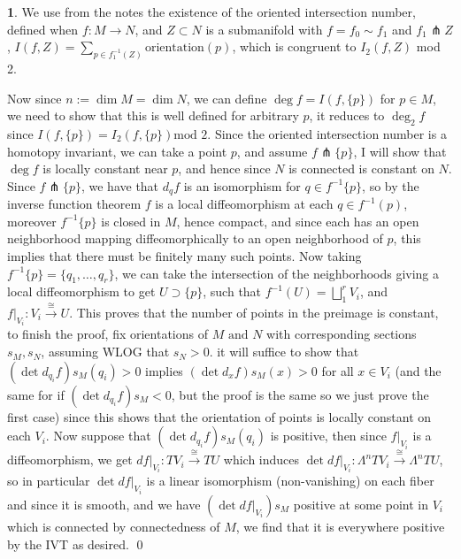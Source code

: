 \documentclass[10.5pt]{article}
\theoremstyle{definition}
\newtheorem{pb}{}
\newcommand{\set}[1]{\{#1\}}
\newcommand{\tand}{\text{ and }}
\begin{document}
    \begin{pb}
        We use from the notes the existence of the oriented intersection number, defined when \(f: M \to N\), and \(Z \subset N\) is a submanifold with \(f = f_0 \sim f_1\) and \(f_1 \pitchfork Z\), \(I(f,Z) = \sum_{p \in f_1^{-1}(Z)} \text{orientation}(p)\), which is congruent to \(I_2(f,Z)\) mod 2. 
        
        Now since \(n := \dim M = \dim N\), we can define \(\deg f = I(f,\set{p})\) for \(p \in M\), we need to show that this is well defined for arbitrary \(p\), it reduces to \(\deg_2 f\) since \(I(f,\set{p}) = I_2(f,\set{p}) \text{mod }2\). Since the oriented intersection number is a homotopy invariant, we can take a point \(p\), and assume \(f \pitchfork \set{p}\), I will show that \(\deg f\) is locally constant near \(p\), and hence since \(N\) is connected is constant on \(N\).
        Since \(f \pitchfork \set{p}\), we have that \(d_qf\) is an isomorphism for \(q \in f^{-1}\set{p}\), so by the inverse function theorem \(f\) is a local diffeomorphism at each \(q \in f^{-1}(p)\), moreover \(f^{-1}\set{p}\) is closed in \(M\), hence compact, and since each has an open neighborhood mapping diffeomorphically to an open neighborhood of \(p\), this implies that there must be finitely many such points. Now taking \(f^{-1}\set{p} = \set{q_1,\hdots,q_r}\), we can take the intersection of the neighborhoods giving a local diffeomorphism to get \(U \supset \set{p}\), such that \(f^{-1}(U) = \bigsqcup_1^r V_i\), and \(f\vert_{V_i}: V_i \overset{\cong}{\longrightarrow} U\). This proves that the number of points in the preimage is constant, to finish the proof, fix orientations of \(M \tand N\) with corresponding sections \(s_M, s_N\), assuming WLOG that \(s_N > 0\). it will suffice to show that \((\det d_{q_i}f) s_M(q_i) > 0\) implies \((\det d_x f)s_M(x) > 0\) for all \(x \in V_i\) (and the same for if \((\det d_{q_i}f)s_M < 0\), but the proof is the same so we just prove the first case) since this shows that the orientation of points is locally constant on each \(V_i\). Now suppose that \((\det d_{q_i}f) s_M(q_i)\) is positive, then since \(f\vert_{V_i}\) is a diffeomorphism, we get \(df\vert_{V_i}: TV_i \overset{\cong}{\longrightarrow} TU\) which induces \(\det df\vert_{V_i}:\Lambda^n TV_i \overset{\cong}{\longrightarrow} \Lambda^n TU\), so in particular \(\det df\vert_{V_i}\) is a linear isomorphism (non-vanishing) on each fiber and since it is smooth, and we have \((\det df\vert_{V_i})s_M\) positive at some point in \(V_i\) which is connected by connectedness of \(M\), we find that it is everywhere positive by the IVT as desired. \qed
    \end{pb}
\end{document}
